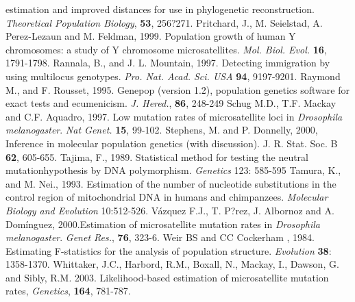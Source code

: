 \begin{thebibliography}{a}
estimation and improved distances for use in phylogenetic reconstruction. \emph{Theoretical Population Biology}, \textbf{53}, 256?271.
 Pritchard, J., M. Seielstad,
A. Perez-Lezaun and M. Feldman, 1999. Population growth of human Y
chromosomes: a study of Y chromosome microsatellites. \emph{Mol.
Biol. Evol.} \textbf{16}, 1791-1798.
Rannala, B., and J. L. Mountain, 1997. Detecting immigration by using multilocus genotypes. \emph{Pro. Nat. Acad. Sci. USA} \textbf{94}, 9197-9201.
 Raymond M., and F. Rousset, 1995. Genepop (version 1.2), population genetics software for exact tests and ecumenicism. \emph{J. Hered.}, \textbf{86}, 248-249
 Schug M.D., T.F. Mackay and C.F. Aquadro, 1997. Low mutation rates of microsatellite loci in \emph{Drosophila melanogaster}. \emph{Nat Genet.} \textbf{15}, 99-102.
 Stephens, M. and P. Donnelly,
 2000, Inference in molecular population genetics (with discussion).
 J. R. Stat. Soc. B \textbf{62}, 605-655.
 Tajima, F., 1989. Statistical method for testing the neutral mutationhypothesis by DNA polymorphism. \emph{Genetics} 
123: 585-595
  Tamura, K., and M. Nei., 1993. Estimation of the number of nucleotide substitutions in the control region of mitochondrial DNA in humans and chimpanzees. \emph{Molecular Biology and Evolution} 10:512-526.
 V\'azquez F.J., T. P?rez, J. Albornoz and A. Dom\'inguez, 2000.Estimation of microsatellite mutation rates in \emph{Drosophila melanogaster}. \emph{Genet Res.}, \textbf{76}, 323-6.
Weir BS and CC Cockerham , 1984. Estimating F-statistics for the analysis of population structure. \emph{Evolution} \textbf{38}: 1358-1370.
 Whittaker, J.C., Harbord, R.M., Boxall, N., Mackay, I.,
Dawson, G. and Sibly, R.M. 2003. Likelihood-based estimation of
microsatellite mutation rates, \emph{Genetics}, \textbf{164},
781-787.
\end{thebibliography}
